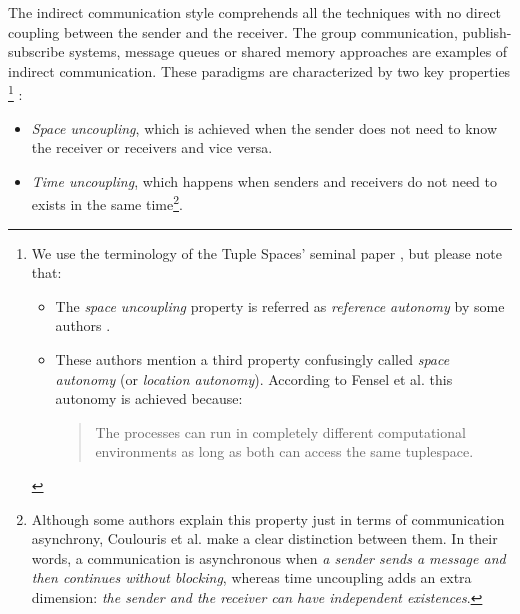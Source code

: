 The indirect communication style comprehends all the techniques with no direct coupling between the sender and the receiver.
The group communication, publish-subscribe systems, message queues or shared memory approaches are examples of indirect communication.
These paradigms are characterized by two key properties \cite{gelernter_generative_1985,coulouris_distributed_2012}
\footnote{
  We use the terminology of the  Tuple Spaces' seminal paper \cite{gelernter_generative_1985}, but please note that:
  \begin{itemize}
    \item The \emph{space uncoupling} property is referred as \emph{reference autonomy} by some authors \cite{fensel_triple-space_2004}.
    \item These authors mention a third property confusingly called \emph{space autonomy} (or \emph{location autonomy}).
	  According to Fensel et al.\cite{fensel_triple-space_2004} this autonomy is achieved because:
	  \begin{quote}
	    The processes can run in completely different computational environments as long as both can access the same tuplespace.
	  \end{quote}
  \end{itemize}
}
:

\begin{itemize}
 \item \emph{Space uncoupling}, which is achieved when the sender does not need to know the receiver or receivers and vice versa.
 \item \emph{Time uncoupling}, which happens when senders and receivers do not need to exists in the same time\footnote{
	  Although some authors \cite{fensel_triple-space_2004,krummenacher_www_2005} explain this property just in terms of communication asynchrony,
	  Coulouris et al.\cite{coulouris_distributed_2012} make a clear distinction between them.
	  In their words, a communication is asynchronous when \emph{a sender sends a message and then continues without blocking},
	  whereas time uncoupling adds an extra dimension: \emph{the sender and the receiver can have independent existences}.
	  }.
 
\end{itemize}

